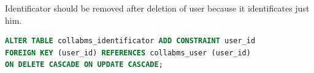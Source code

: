 \documentclass[12pt,oneside,a4paper]{article}
\begin{document}
\noindent
Identificator should be removed after deletion of user because it identificates just him.

\begin{lstlisting}[language=SQL]
ALTER TABLE collabms_identificator ADD CONSTRAINT user_id
FOREIGN KEY (user_id) REFERENCES collabms_user (user_id)
ON DELETE CASCADE ON UPDATE CASCADE;
\end{lstlisting}

\begin{lstlisting}[language=SQL]

\end{lstlisting}
\end{document}
